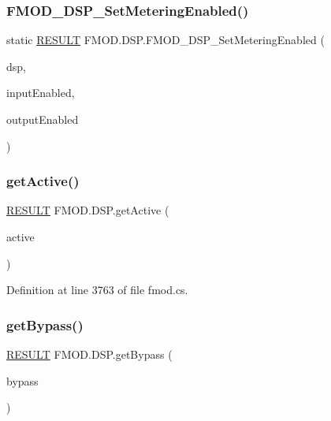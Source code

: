 \subsubsection{\texorpdfstring{F\+M\+O\+D\+\_\+\+D\+S\+P\+\_\+\+Set\+Metering\+Enabled()}{FMOD\_DSP\_SetMeteringEnabled()}}
{\footnotesize\ttfamily static \hyperlink{namespace_f_m_o_d_a305d1176ef3f8c8815861a60407ac33d}{R\+E\+S\+U\+LT} F\+M\+O\+D.\+D\+S\+P.\+F\+M\+O\+D\+\_\+\+D\+S\+P\+\_\+\+Set\+Metering\+Enabled (\begin{DoxyParamCaption}\item[{Int\+Ptr}]{dsp,  }\item[{bool}]{input\+Enabled,  }\item[{bool}]{output\+Enabled }\end{DoxyParamCaption})}

\mbox{\label{class_f_m_o_d_1_1_d_s_p_a23023e1c53c97ab3a1931a4ec5a9ea5c}} 
\subsubsection{\texorpdfstring{get\+Active()}{getActive()}}
{\footnotesize\ttfamily \hyperlink{namespace_f_m_o_d_a305d1176ef3f8c8815861a60407ac33d}{R\+E\+S\+U\+LT} F\+M\+O\+D.\+D\+S\+P.\+get\+Active (\begin{DoxyParamCaption}\item[{out bool}]{active }\end{DoxyParamCaption})}



Definition at line 3763 of file fmod.\+cs.

\mbox{\label{class_f_m_o_d_1_1_d_s_p_a5fd30b33615332c87ed8f19975f910a5}} 
\subsubsection{\texorpdfstring{get\+Bypass()}{getBypass()}}
{\footnotesize\ttfamily \hyperlink{namespace_f_m_o_d_a305d1176ef3f8c8815861a60407ac33d}{R\+E\+S\+U\+LT} F\+M\+O\+D.\+D\+S\+P.\+get\+Bypass (\begin{DoxyParamCaption}\item[{out bool}]{bypass }\end{DoxyParamCaption})}



